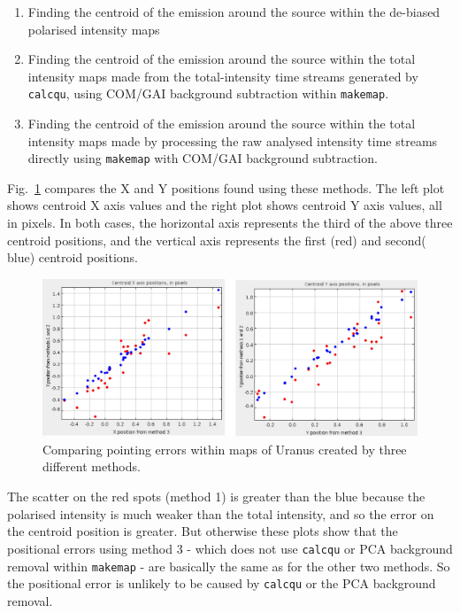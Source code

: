 \documentclass[twoside,11pt]{starlink}
\begin{document}
\begin{enumerate}
\item Finding the centroid of the emission around the source within the de-biased
polarised intensity maps
\item Finding the centroid of the emission around the source within the total
intensity maps made from the total-intensity time streams generated by
\texttt{calcqu}, using COM/GAI background subtraction within \texttt{makemap}.
\item Finding the centroid of the emission around the source within the total
intensity maps made by processing the raw analysed intensity time streams
directly using \texttt{makemap} with COM/GAI background subtraction.
\end{enumerate}

Fig.~\ref{fig:point1} compares the X and Y positions found using these
methods. The left plot shows centroid X axis values and the right plot
shows centroid Y axis values, all in pixels. In both cases, the
horizontal axis represents the third of the above three centroid
positions, and the vertical axis represents the first (red) and second(
blue) centroid positions.

\begin{figure}
\includegraphics[width=\columnwidth]{point1}
\caption{Comparing pointing errors within maps of Uranus created by
three different methods.}
\label{fig:point1}
\end{figure}

The scatter on the red spots (method 1) is greater than the blue because
the polarised intensity is much weaker than the total intensity, and so
the error on the centroid position is greater. But otherwise these plots
show that the positional errors using method 3 - which does not use
\texttt{calcqu} or PCA background removal within \texttt{makemap} -
are basically the same as for the other two methods. So the positional
error is unlikely to be caused by \texttt{calcqu} or the PCA background
removal.
\end{document}
